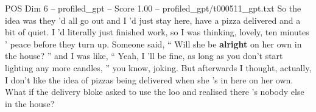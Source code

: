 \begin{textsample}{POS Dim 6 – profiled\_gpt – Score 1.00 – profiled\_gpt/t000511\_gpt.txt}  \label{ex:f6_pos_033}
So the idea was they ’d all go out and I ’d just stay here, have a pizza delivered and a bit of quiet.
I ’d literally just finished work, so I was thinking, lovely, ten minutes ’ peace before they turn up.
Someone said, “ Will she be \textbf{alright} on her own in the house? ” and I was like, “ Yeah, I ’ll be fine, as long as you don't start lighting any more candles, ” you know, joking.
But afterwards I thought, actually, I don't like the idea of pizzas being delivered when she ’s in here on her own.
What if the delivery bloke asked to use the loo and realised there ’s nobody else in the house?

\end{textsample}
